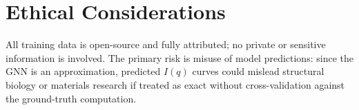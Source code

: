 \documentclass[final]{article}
\begin{document}
\section{Ethical Considerations}

All training data is open-source and fully attributed; no private or sensitive information
is involved. The primary risk is misuse of model predictions: since the GNN is an
approximation, predicted $I(q)$ curves could mislead structural biology or materials
research if treated as exact without cross-validation against the ground-truth computation.
\end{document}
